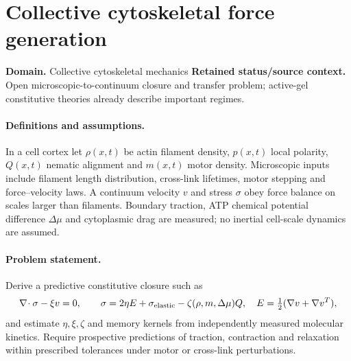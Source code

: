 \documentclass[11pt]{article}
\begin{document}
\section*{Collective cytoskeletal force generation}
\label{prob:088}
\label{rank:134}
\par\smallskip

\noindent\textbf{Domain.} Collective cytoskeletal mechanics \quad \textbf{Retained status/source context.} Open microscopic-to-continuum closure and transfer problem; active-gel constitutive theories already describe important regimes.
\paragraph{Definitions and assumptions.} In a cell cortex let $\rho(x,t)$ be actin filament density, $p(x,t)$ local polarity, $Q(x,t)$ nematic alignment and $m(x,t)$ motor density. Microscopic inputs include filament length distribution, cross-link lifetimes, motor stepping and force--velocity laws. A continuum velocity $v$ and stress $\sigma$ obey force balance on scales larger than filaments. Boundary traction, ATP chemical potential difference $\Delta\mu$ and cytoplasmic drag are measured; no inertial cell-scale dynamics are assumed.
\paragraph{Problem statement.} Derive a predictive constitutive closure such as
\[\nabla\!\cdot\sigma-\xi v=0,\qquad \sigma=2\eta E+\sigma_{\rm elastic}-\zeta(\rho,m,\Delta\mu)Q,\quad E=\tfrac12(\nabla v+\nabla v^T),\]
and estimate $\eta,\xi,\zeta$ and memory kernels from independently measured molecular kinetics. Require prospective predictions of traction, contraction and relaxation within prescribed tolerances under motor or cross-link perturbations.
\end{document}

